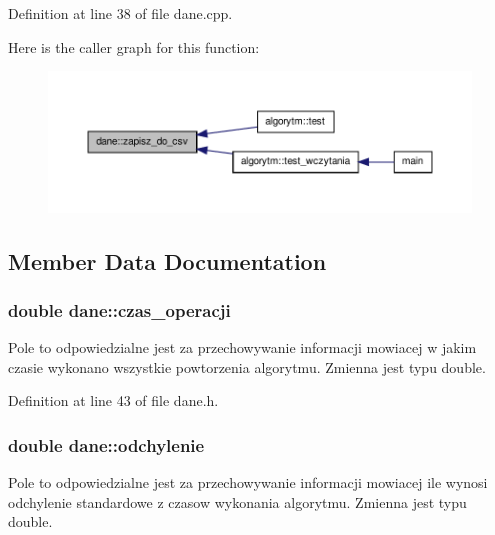 Definition at line 38 of file dane.\-cpp.



Here is the caller graph for this function\-:
\nopagebreak
\begin{figure}[H]
\begin{center}
\leavevmode
\includegraphics[width=350pt]{classdane_a8427efc3e40d63911205b297aecb4ca9_icgraph}
\end{center}
\end{figure}




\subsection{Member Data Documentation}
\hypertarget{classdane_af0dccb6c88a06aaf08441cc01d6bff27}{
\subsubsection[{czas\-\_\-operacji}]{\setlength{\rightskip}{0pt plus 5cm}double dane\-::czas\-\_\-operacji}}\label{classdane_af0dccb6c88a06aaf08441cc01d6bff27}
Pole to odpowiedzialne jest za przechowywanie informacji mowiacej w jakim czasie wykonano wszystkie powtorzenia algorytmu. Zmienna jest typu double. 

Definition at line 43 of file dane.\-h.

\hypertarget{classdane_adf1201c327225fc441f65b6d3b0d17e9}{
\subsubsection[{odchylenie}]{\setlength{\rightskip}{0pt plus 5cm}double dane\-::odchylenie}}\label{classdane_adf1201c327225fc441f65b6d3b0d17e9}
Pole to odpowiedzialne jest za przechowywanie informacji mowiacej ile wynosi odchylenie standardowe z czasow wykonania algorytmu. Zmienna jest typu double. 

